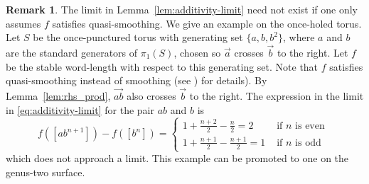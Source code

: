 \documentclass[11pt]{amsart}
\newcommand{\ora}[1]{\overrightarrow{#1}}
\numberwithin{equation}{section}
\numberwithin{figure}{section}
\theoremstyle{definition}
\newtheorem{remark}[theorem]{Remark}
\theoremstyle{plain}
\begin{document}
\begin{remark}
The limit in Lemma~\ref{lem:additivity-limit} need not exist if one
only assumes $f$ satisfies quasi-smoothing.
We give an example on the once-holed torus.
Let $S$ be the once-punctured torus with generating set $\{a,b,b^2\}$,
where $a$ and $b$ are the standard generators of $\pi_1(S)$, chosen so
$\ora{a}$ crosses $\ora{b}$ to the right.
Let $f$ be the stable word-length with respect to this generating set. Note that $f$ satisfies quasi-smoothing instead of smoothing (see \cite[Example~4.10]{MGT21:Smoothings}) for details).
By Lemma~\ref{lem:rhs_prod}, $\ora{ab}$ also crosses $\ora{b}$ to the
right.
The expression in the limit in \eqref{eq:additivity-limit} for the
pair $ab$ and $b$ is
\begin{equation*}
  f([ab^{n+1}])-f([b^n])=\begin{cases} 1+ \frac{n+2}{2} - \frac{n}{2}=2& \mbox{ if } n \mbox{ is even } \\
    1+ \frac{n+1}{2} - \frac{n+1}{2}=1 & \mbox{ if } n \mbox{ is odd }
  \end{cases}
\end{equation*}
which does not approach a limit.
This example can be promoted to one on the genus-two surface.
\label{rmk:nonconvex}
\end{remark}
\end{document}
